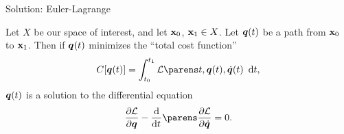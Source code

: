 \documentclass{fkpresentation}
\begin{document}



\begin{frame}{Solution: Euler-Lagrange}
  \begin{theorem}
    Let $X$ be our space of interest, and let $\mathbf{x}_0$, $\mathbf{x}_1 \in X$.
    Let $\bm q(t)$ be a path from $\mathbf{x}_0$ to $\mathbf{x}_1$. Then if $\bm q(t)$
    minimizes the ``total cost function''
    \[
      C[\Qq(t)] = \int_{t_0}^{t_1} \mc L\pn{t, \Qq(t), \dot{\Qq}(t)} \dd
      t,
    \]
    $\bm q(t)$ is a solution to the differential equation
    \[
      \pd{\mc L}{\Qq} - \od{}{t} \pn{\pd{\mc L}{\dot{\Qq}}} = 0.
    \]
  \end{theorem}
\end{frame}
\end{document}

